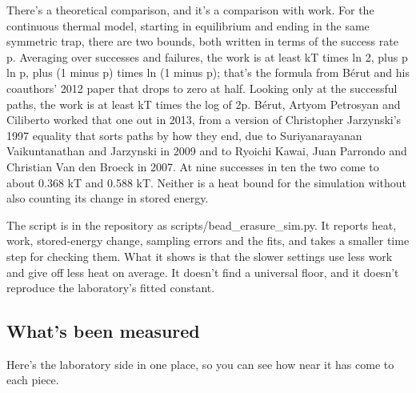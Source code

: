 \documentclass[11pt,twoside]{article}
\theoremstyle{thielethm}
\theoremstyle{thieledef}
\theoremstyle{thieledef}
\theoremstyle{thieledef}
\theoremstyle{thielethm}
\theoremstyle{thieleobs}
\theoremstyle{thielethm}
\begin{document}
There's a theoretical comparison, and it's a comparison with work. For the continuous thermal model, starting in equilibrium and ending in the same symmetric trap, there are two bounds, both written in terms of the success rate p. Averaging over successes and failures, the work is at least kT times ln 2, plus p ln p, plus (1 minus p) times ln (1 minus p); that's the formula from Bérut and his coauthors' 2012 paper that drops to zero at half. Looking only at the successful paths, the work is at least kT times the log of 2p. Bérut, Artyom Petrosyan and Ciliberto worked that one out in 2013, from a version of Christopher Jarzynski's 1997 equality that sorts paths by how they end, due to Suriyanarayanan Vaikuntanathan and Jarzynski in 2009 and to Ryoichi Kawai, Juan Parrondo and Christian Van den Broeck in 2007. At nine successes in ten the two come to about 0.368 kT and 0.588 kT. Neither is a heat bound for the simulation without also counting its change in stored energy.

The script is in the repository as scripts/bead\_erasure\_sim.py. It reports heat, work, stored-energy change, sampling errors and the fits, and takes a smaller time step for checking them. What it shows is that the slower settings use less work and give off less heat on average. It doesn't find a universal floor, and it doesn't reproduce the laboratory's fitted constant.

\subsection{What's been measured}

Here's the laboratory side in one place, so you can see how near it has come to each piece.
\end{document}
